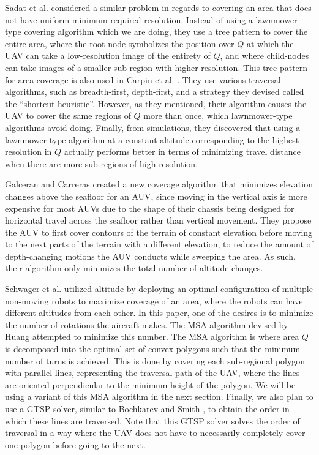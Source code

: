 \documentclass[conference]{IEEEtran}
\theoremstyle{plain}%
\begin{document}
Sadat et al. \cite{sadat2014recursive} considered a similar problem in regards to covering an area that does not have uniform minimum-required resolution. Instead of using a lawnmower-type covering algorithm which we are doing, they use a tree pattern to cover the entire area, where the root node symbolizes the position over $Q$ at which the UAV can take a low-resolution image of the entirety of $Q$, and where child-nodes can take images of a smaller sub-region with higher resolution. This tree pattern for area coverage is also used in Carpin et al. \cite{carpin2013variable}. They use various traversal algorithms, such as breadth-first, depth-first, and a strategy they devised called the ``shortcut heuristic''. However, as they mentioned, their algorithm causes the UAV to cover the same regions of $Q$ more than once, which lawnmower-type algorithms avoid doing. Finally, from simulations, they discovered that using a lawnmower-type algorithm at a constant altitude corresponding to the highest resolution in $Q$ actually performs better in terms of minimizing travel distance when there are more sub-regions of high resolution.

Galceran and Carreras \cite{galceran2013planning} created a new coverage algorithm that minimizes elevation changes above the seafloor for an AUV, since moving in the vertical axis is more expensive for most AUVs due to the shape of their chassis being designed for horizontal travel across the seafloor rather than vertical movement. They propose the AUV to first cover contours of the terrain of constant elevation before moving to the next parts of the terrain with a different elevation, to reduce the amount of depth-changing motions the AUV conducts while sweeping the area. As such, their algorithm only minimizes the total number of altitude changes.

Schwager et al. \cite{schwager2011eyes} utilized altitude by deploying an optimal configuration of multiple non-moving robots to maximize coverage of an area, where the robots can have different altitudes from each other.
In this paper, one of the desires is to minimize the number of rotations the aircraft makes. The MSA algorithm devised by Huang \cite{huang2001optimal} attempted to minimize this number. The MSA algorithm is where area $Q$ is decomposed into the optimal set of convex polygons such that the minimum number of turns is achieved. This is done by covering each sub-regional polygon with parallel lines, representing the traversal path of the UAV, where the lines are oriented perpendicular to the minimum height of the polygon. We will be using a variant of this MSA algorithm in the next section.
Finally, we also plan to use a GTSP solver, similar to Bochkarev and Smith \cite{bochkarevminimizing}, to obtain the order in which these lines are traversed. Note that this GTSP solver solves the order of traversal in a way where the UAV does not have to necessarily completely cover one polygon before going to the next.
\end{document}
